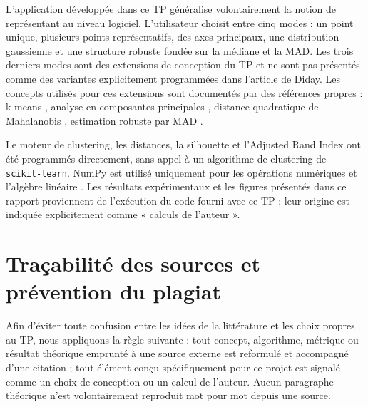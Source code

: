 \documentclass[12pt,a4paper]{article}
\begin{document}
L'application développée dans ce TP généralise volontairement la notion de représentant au niveau logiciel. L'utilisateur choisit entre cinq modes : un point unique, plusieurs points représentatifs, des axes principaux, une distribution gaussienne et une structure robuste fondée sur la médiane et la MAD. Les trois derniers modes sont des extensions de conception du TP et ne sont pas présentés comme des variantes explicitement programmées dans l'article de Diday. Les concepts utilisés pour ces extensions sont documentés par des références propres : k-means \cite{macqueen1967,lloyd1982}, analyse en composantes principales \cite{jolliffe2016}, distance quadratique de Mahalanobis \cite{mahalanobis1936}, estimation robuste par MAD \cite{rousseeuwcroux1993}.

Le moteur de clustering, les distances, la silhouette et l'Adjusted Rand Index ont été programmés directement, sans appel à un algorithme de clustering de \texttt{scikit-learn}. NumPy est utilisé uniquement pour les opérations numériques et l'algèbre linéaire \cite{harris2020}. Les résultats expérimentaux et les figures présentés dans ce rapport proviennent de l'exécution du code fourni avec ce TP ; leur origine est indiquée explicitement comme « calculs de l'auteur ».

\section{Traçabilité des sources et prévention du plagiat}

Afin d'éviter toute confusion entre les idées de la littérature et les choix propres au TP, nous appliquons la règle suivante : tout concept, algorithme, métrique ou résultat théorique emprunté à une source externe est reformulé et accompagné d'une citation ; tout élément conçu spécifiquement pour ce projet est signalé comme un choix de conception ou un calcul de l'auteur. Aucun paragraphe théorique n'est volontairement reproduit mot pour mot depuis une source.
\end{document}
